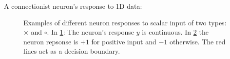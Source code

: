 \begin{frame}
A connectionist neuron's response to 1D data:

\begin{figure}[ht]
     \centering
     \begin{subfigure}[t]{0.35\textwidth}
         \centering
         \usebox{\imagebox}%
         \caption{}
         \label{fig:neuron_1d_sigmoid}
     \end{subfigure}
     \hfill
     \begin{subfigure}[t]{0.35\textwidth}
         \centering
         \caption{}
         \label{fig:neuron_1d_sign}
     \end{subfigure}
     \caption{Examples of different neuron responses to scalar input of two types: $\times$ and $\circ$. In \ref{fig:neuron_1d_sigmoid}: The neuron's response $y$ is continuous. In \ref{fig:neuron_1d_sign} the neuron repsonse is $+1$ for positive input and $-1$ otherwise. The red lines act as a decision boundary.}
	 \label{fig:neuron_1d}
\end{figure}

\end{frame}

